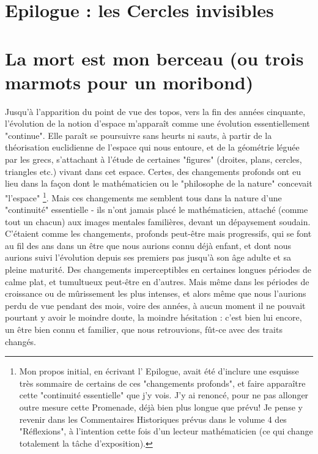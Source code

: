 \section*{Epilogue : les Cercles invisibles}

\section{La mort est mon berceau (ou trois marmots pour un moribond)}

Jusqu'à l'apparition du point de vue des topos, vers la fin des années cinquante, l'évolution de la notion d'espace m'apparaît comme une évolution essentiellement "continue". Elle paraît se poursuivre sans heurts ni sauts, à partir de la théorisation euclidienne de l'espace qui nous entoure, et de la géométrie léguée par les grecs, s'attachant à l'étude de certaines "figures" (droites, plans, cercles, triangles etc.) vivant dans cet espace. Certes, des changements profonds ont eu lieu dans la façon dont le mathématicien ou le "philosophe de la nature" concevait "l'espace" \footnote{Mon propos initial, en écrivant l' Epilogue, avait été d'inclure une esquisse très sommaire de certains de ces "changements profonds", et faire apparaître cette "continuité essentielle" que j'y vois. J'y ai renoncé, pour ne pas allonger outre mesure cette Promenade, déjà bien plus longue que prévu! Je pense y revenir dans les Commentaires Historiques prévus dans le volume 4 des "Réflexions", à l'intention cette fois d'un lecteur mathématicien (ce qui change totalement la tâche d'exposition).}. Mais ces changements me semblent tous dans la nature d'une "continuité" essentielle - ils n'ont jamais placé le mathématicien, attaché (comme tout un chacun) aux images mentales familières, devant un dépaysement soudain. C'étaient comme les changements, profonds peut-être mais progressifs, qui se font au fil des ans dans un être que nous aurions connu déjà enfant, et dont nous aurions suivi l'évolution depuis ses premiers pas jusqu'à son âge adulte et sa pleine maturité. Des changements imperceptibles en certaines longues périodes de calme plat, et tumultueux peut-être en d'autres. Mais même dans les périodes de croissance ou de mûrissement les plus intenses, et alors même que nous l'aurions perdu de vue pendant des mois, voire des années, à aucun moment il ne pouvait pourtant y avoir le moindre doute, la moindre hésitation : c'est bien lui encore, un être bien connu et familier, que nous retrouvions, fût-ce avec des traits changés.

